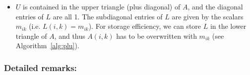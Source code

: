 \documentclass{scrartcl}
\newenvironment{mymdframed}[1]{%
\mdfsetup{%
frametitle={\colorbox{white}{\,#1\,}},
frametitleaboveskip=-\ht\strutbox,
frametitlealignment=\raggedright
}%
\begin{mdframed}[style=exampledefault]
}{\end{mdframed}}
\begin{document}
            \begin{itemize}
                \item $U$ is contained in the upper triangle (plus diagonal) of $A$, and the diagonal entries of $L$ are all 1. The subdiagonal entries of $L$ are given by the scalars $m_{ik}$ (i.e. $L(i,k) = m_{ik}$). For storage efficiency, we can store $L$ in the lower triangle of $A$, and thus $A(i,k)$ has to be overwritten with $m_{ik}$ (see Algorithm~\ref{alg:plu}).
            \end{itemize}
    
    \subsubsection*{Detailed remarks:}
\end{document}
